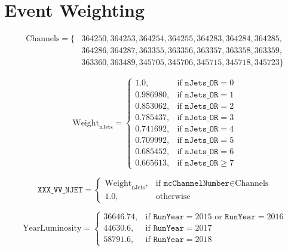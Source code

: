\clearpage

\section{Event Weighting}
\label{appendix:weights}

\begin{align}
    \text{Channels} = \{
     & 364250, 364253, 364254, 364255, 364283, 364284, 364285,  \nonumber \\
     & 364286, 364287, 363355, 363356, 363357, 363358, 363359,            \\
     & 363360, 363489, 345705, 345706, 345715, 345718, 345723\} \nonumber
\end{align}

\begin{equation}
    \text{Weight}_{\text{nJets}} = \begin{cases}
        1.0,      & \text{if } \texttt{nJets\_OR} = 0    \\
        0.986980, & \text{if } \texttt{nJets\_OR} = 1    \\
        0.853062, & \text{if } \texttt{nJets\_OR} = 2    \\
        0.785437, & \text{if } \texttt{nJets\_OR} = 3    \\
        0.741692, & \text{if } \texttt{nJets\_OR} = 4    \\
        0.709992, & \text{if } \texttt{nJets\_OR} = 5    \\
        0.685452, & \text{if } \texttt{nJets\_OR} = 6    \\
        0.665613, & \text{if } \texttt{nJets\_OR} \geq 7
    \end{cases}
\end{equation}

\begin{equation}
    \texttt{XXX\_VV\_NJET} = \begin{cases}
        \text{Weight}_{\text{nJets}}, & \text{if } \texttt{mcChannelNumber} \in \text{Channels} \\
        1.0,                          & \text{otherwise}
    \end{cases}
\end{equation}

\begin{equation}
    \text{YearLuminosity} = \begin{cases}
        36646.74, & \text{if } \texttt{RunYear} = 2015 \text{ or } \texttt{RunYear} = 2016 \\
        44630.6,  & \text{if } \texttt{RunYear} = 2017                                     \\
        58791.6,  & \text{if } \texttt{RunYear} = 2018
    \end{cases}
\end{equation}


